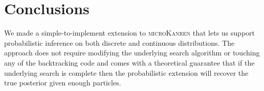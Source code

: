\documentclass[
]{ceurart}
\begin{document}
\section{Conclusions}

We made a simple-to-implement extension to \textsc{microKanren} that
lets us support probabilistic inference on both discrete and
continuous distributions. The approach does not require modifying the
underlying search algorithm or touching any of the backtracking code and
comes with a theoretical guarantee that if the underlying search is
complete then the probabilistic extension will recover the true
posterior given enough particles.



\end{document}
